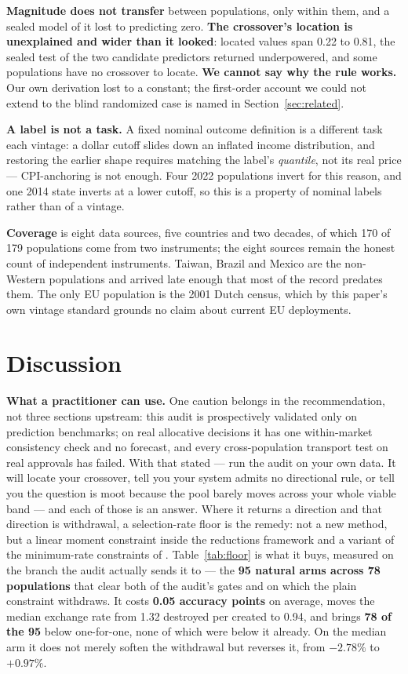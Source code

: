 \documentclass[conference]{IEEEtran}
\begin{document}
\textbf{Magnitude does not transfer} between populations, only within them, and a sealed model
of it lost to predicting zero. \textbf{The crossover's location is unexplained and wider than
it looked}: located values span 0.22 to 0.81, the sealed test of the two candidate predictors
returned underpowered, and some populations have no crossover to locate. \textbf{We cannot say
why the rule works.} Our own derivation lost to a constant; the first-order account we could
not extend to the blind randomized case is named in Section~\ref{sec:related}.

\textbf{A label is not a task.} A fixed nominal outcome definition is a different task each
vintage: a dollar cutoff slides down an inflated income distribution, and restoring the
earlier shape requires matching the label's \emph{quantile}, not its real price ---
CPI-anchoring is not enough. Four 2022 populations invert for this reason, and one 2014 state
inverts at a lower cutoff, so this is a property of nominal labels rather than of a vintage.

\textbf{Coverage} is eight data sources, five countries and two decades, of which 170 of 179 populations come from two instruments; the eight sources remain the honest count of
independent instruments. Taiwan, Brazil and Mexico are the non-Western populations and arrived
late enough that most of the record predates them. The only EU population is the 2001 Dutch
census, which by this paper's own vintage standard grounds no claim about current EU
deployments.

\section{Discussion}
\label{sec:discussion}

\textbf{What a practitioner can use.} One caution belongs in the recommendation, not three sections upstream: this audit is prospectively validated only on prediction benchmarks; on real allocative decisions it has one within-market consistency check and no forecast, and every cross-population transport test on real approvals has failed. With that stated --- run the audit on your own data. It will locate your
crossover, tell you your system admits no directional rule, or tell you the question is moot
because the pool barely moves across your whole viable band --- and each of those is an
answer. Where it returns a direction and that direction is withdrawal, a selection-rate floor is the
remedy: not a new method, but a linear moment constraint inside the reductions framework
\cite{agarwal2018} and a variant of the minimum-rate constraints of \cite{mittelstadt2023}.
Table~\ref{tab:floor} is what it buys, measured on the branch the audit actually sends it to
--- the \textbf{95 natural arms across 78 populations} that clear both of the audit's gates
and on which the plain constraint withdraws. It costs \textbf{0.05 accuracy points} on
average, moves the median exchange rate from 1.32 destroyed per created to 0.94, and brings \textbf{78 of the 95} below one-for-one, none of which were below it already. On the median
arm it does not merely soften the withdrawal but reverses it, from $-2.78\%$ to $+0.97\%$.
\end{document}
